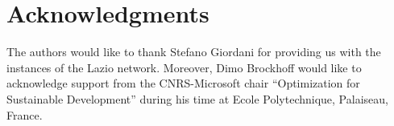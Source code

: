 \documentclass[preprint,12pt]{elsarticle}
\begin{document}
\section{Acknowledgments}
The authors would like to thank Stefano Giordani for providing us with the instances of the Lazio network. Moreover, Dimo Brockhoff would like to acknowledge support from the CNRS-Microsoft chair "`Optimization for Sustainable Development"' during his time at Ecole Polytechnique, Palaiseau, France.


% 
 
 \footnotesize
 
\end{document}
